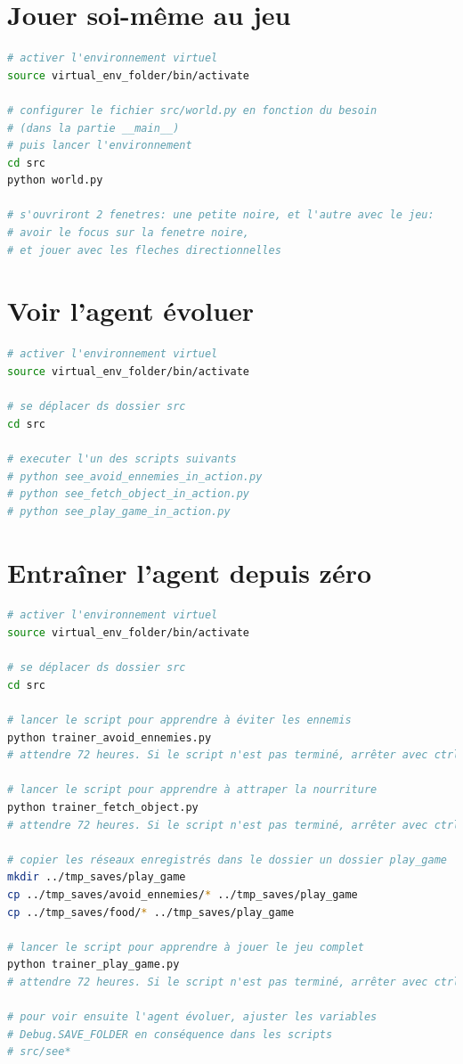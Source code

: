 \documentclass[11pt,a4paper]{report}
\begin{document}
 \section{Jouer soi-même au jeu}
  \begin{lstlisting}[language=bash]
# activer l'environnement virtuel
source virtual_env_folder/bin/activate

# configurer le fichier src/world.py en fonction du besoin
# (dans la partie __main__)
# puis lancer l'environnement
cd src
python world.py

# s'ouvriront 2 fenetres: une petite noire, et l'autre avec le jeu:
# avoir le focus sur la fenetre noire, 
# et jouer avec les fleches directionnelles
  \end{lstlisting}  
  
 \section{Voir l'agent évoluer}
  \begin{lstlisting}[language=bash]
# activer l'environnement virtuel
source virtual_env_folder/bin/activate

# se déplacer ds dossier src
cd src 

# executer l'un des scripts suivants
# python see_avoid_ennemies_in_action.py
# python see_fetch_object_in_action.py
# python see_play_game_in_action.py
  \end{lstlisting}  

\section{Entraîner l'agent depuis zéro}
\begin{lstlisting}[language=bash]
# activer l'environnement virtuel
source virtual_env_folder/bin/activate

# se déplacer ds dossier src
cd src 

# lancer le script pour apprendre à éviter les ennemis
python trainer_avoid_ennemies.py
# attendre 72 heures. Si le script n'est pas terminé, arrêter avec ctrl+c

# lancer le script pour apprendre à attraper la nourriture
python trainer_fetch_object.py
# attendre 72 heures. Si le script n'est pas terminé, arrêter avec ctrl+c

# copier les réseaux enregistrés dans le dossier un dossier play_game
mkdir ../tmp_saves/play_game
cp ../tmp_saves/avoid_ennemies/* ../tmp_saves/play_game
cp ../tmp_saves/food/* ../tmp_saves/play_game

# lancer le script pour apprendre à jouer le jeu complet
python trainer_play_game.py
# attendre 72 heures. Si le script n'est pas terminé, arrêter avec ctrl+c

# pour voir ensuite l'agent évoluer, ajuster les variables 
# Debug.SAVE_FOLDER en conséquence dans les scripts
# src/see*

  \end{lstlisting}  
\end{document}
